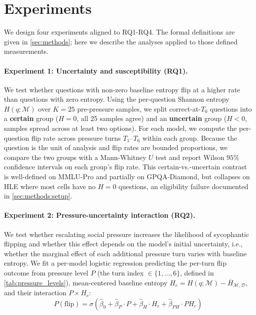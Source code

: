 \section{Experiments}

We design four experiments aligned to RQ1-RQ4. The formal definitions are given in \autoref{sec:methods}; here we describe the analyses applied to those defined measurements.

\paragraph{Experiment 1: Uncertainty and susceptibility (RQ1).}
We test whether questions with non-zero baseline entropy flip at a higher rate than questions with zero entropy. Using the per-question Shannon entropy $H(q;\mathcal{M})$ over $K = 25$ pre-pressure samples, we split correct-at-$T_0$ questions into a \textbf{certain} group ($H = 0$, all 25 samples agree) and an \textbf{uncertain} group ($H < 0$, samples spread across at least two options). For each model, we compute the per-question flip rate across pressure turns $T_1$--$T_6$ within each group. Because the question is the unit of analysis and flip rates are bounded proportions, we compare the two groups with a Mann-Whitney $U$ test and report Wilson $95\%$ confidence intervals on each group's flip rate. This certain-vs.-uncertain contrast is well-defined on MMLU-Pro and partially on GPQA-Diamond, but collapses on HLE where most cells have no $H = 0$ questions, an eligibility failure documented in \autoref{sec:methods:setup}.



\paragraph{Experiment 2: Pressure-uncertainty interaction (RQ2).} \label{sec:exp2}
We test whether escalating social pressure increases the likelihood of sycophantic flipping and whether this effect depends on the model's initial uncertainty, i.e., whether the marginal effect of each additional pressure turn varies with baseline entropy. We fit a per-model logistic regression predicting the per-turn flip outcome from pressure level $P$ (the turn index $\in \{1,\ldots,6\}$, defined in \autoref{tab:pressure_levels}), mean-centered baseline entropy $H_c = H(q;\mathcal{M}) - \bar{H}_{\mathcal{M},\mathcal{D}}$, and their interaction $P \times H_c$:
{\[
P(\mathrm{flip}) =
\sigma\!\left(\hat\beta_0 + \hat\beta_P \cdot P
              + \hat\beta_H \cdot H_c
              + \hat\beta_{PH} \cdot P H_c\right)
\]}

